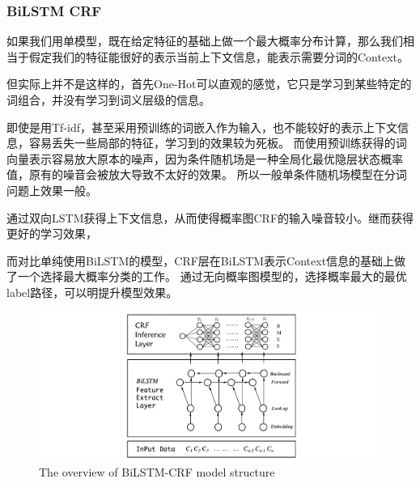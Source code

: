 \subsubsection{BiLSTM CRF}
\label{sec:bilstm_crf}

如果我们用单模型，既在给定特征的基础上做一个最大概率分布计算，那么我们相当于假定我们的特征能很好的表示当前上下文信息，能表示需要分词的Context。

但实际上并不是这样的，首先One-Hot可以直观的感觉，它只是学习到某些特定的词组合，并没有学习到词义层级的信息。

即使是用Tf-idf，甚至采用预训练的词嵌入作为输入，也不能较好的表示上下文信息，容易丢失一些局部的特征，学习到的效果较为死板。
而使用预训练获得的词向量表示容易放大原本的噪声，因为条件随机场是一种全局化最优隐层状态概率值，原有的噪音会被放大导致不太好的效果。
所以一般单条件随机场模型在分词问题上效果一般。

通过双向LSTM获得上下文信息，从而使得概率图CRF的输入噪音较小。继而获得更好的学习效果，

而对比单纯使用BiLSTM的模型，CRF层在BiLSTM表示Context信息的基础上做了一个选择最大概率分类的工作。
通过无向概率图模型的，选择概率最大的最优label路径，可以明提升模型效果。


\begin{figure}[htbp!]
    \begin{center}
    \includegraphics[width=1\textwidth]{figures/model.pdf}
    \end{center}
    \caption{The overview of BiLSTM-CRF model structure}
    \label{fig:overall_model}
\end{figure}